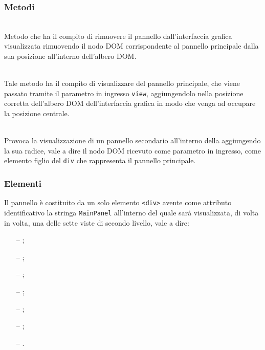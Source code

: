 \subsubsection*{Metodi}
\begin{description}
  \item{}\\
  Metodo che ha il compito di rimuovere il pannello dall'interfaccia grafica visualizzata rimuovendo il nodo DOM corrispondente al pannello principale dalla sua posizione all'interno dell'albero DOM\@.
  
  \item{}\\
  Tale metodo ha il compito di visualizzare del pannello principale, che viene passato tramite il parametro in ingresso \verb'view', aggiungendolo nella posizione corretta dell'albero DOM dell'interfaccia grafica in modo che venga ad occupare la posizione centrale.
  
  \item{}\\
  Provoca la visualizzazione di un pannello secondario all'interno della  aggiungendo la sua radice, vale a dire il nodo DOM ricevuto come parametro in ingresso, come elemento figlio del \verb'div' che rappresenta il pannello principale.
  
\end{description}

\subsubsection*{Elementi}
Il pannello è costituito da un solo elemento \verb'<div>' avente come attributo identificativo la stringa \verb'MainPanel' all'interno del quale sarà visualizzata, di volta in volta, una delle sette viste di secondo livello, vale a dire:
\begin{itemize}
  \item[--] ;
  \item[--] ;
  \item[--] ;
  \item[--] ;
  \item[--] ;
  \item[--] ;
  \item[--] .
\end{itemize}


